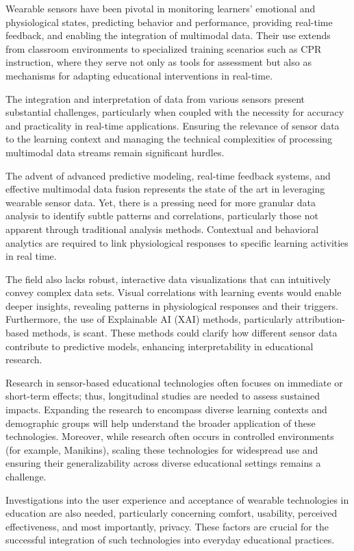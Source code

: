 \documentclass[manuscript,screen,review]{acmart}
\begin{document}
Wearable sensors have been pivotal in monitoring learners' emotional and physiological states, predicting behavior and performance, providing real-time feedback, and enabling the integration of multimodal data. Their use extends from classroom environments to specialized training scenarios such as CPR instruction, where they serve not only as tools for assessment but also as mechanisms for adapting educational interventions in real-time.

The integration and interpretation of data from various sensors present substantial challenges, particularly when coupled with the necessity for accuracy and practicality in real-time applications. Ensuring the relevance of sensor data to the learning context and managing the technical complexities of processing multimodal data streams remain significant hurdles.

The advent of advanced predictive modeling, real-time feedback systems, and effective multimodal data fusion represents the state of the art in leveraging wearable sensor data. Yet, there is a pressing need for more granular data analysis to identify subtle patterns and correlations, particularly those not apparent through traditional analysis methods. Contextual and behavioral analytics are required to link physiological responses to specific learning activities in real time.

The field also lacks robust, interactive data visualizations that can intuitively convey complex data sets. Visual correlations with learning events would enable deeper insights, revealing patterns in physiological responses and their triggers. Furthermore, the use of Explainable AI (XAI) methods, particularly attribution-based methods, is scant. These methods could clarify how different sensor data contribute to predictive models, enhancing interpretability in educational research.

Research in sensor-based educational technologies often focuses on immediate or short-term effects; thus, longitudinal studies are needed to assess sustained impacts. Expanding the research to encompass diverse learning contexts and demographic groups will help understand the broader application of these technologies. Moreover, while research often occurs in controlled environments (for example, Manikins), scaling these technologies for widespread use and ensuring their generalizability across diverse educational settings remains a challenge.

Investigations into the user experience and acceptance of wearable technologies in education are also needed, particularly concerning comfort, usability, perceived effectiveness, and most importantly, privacy. These factors are crucial for the successful integration of such technologies into everyday educational practices.
\end{document}
